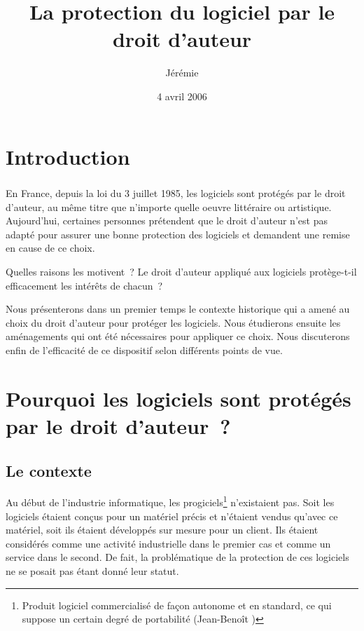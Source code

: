\documentclass[pdftex,a4paper,11pt]{report}
\begin{document}
\title{La protection du logiciel par le droit d'auteur}
\author{
	Jérémie 
}
\date{4 avril 2006}

\maketitle

\chapter*{Introduction}
\paragraph{}
En France, depuis la loi du 3 juillet 1985, les logiciels sont protégés par le droit d'auteur, au même titre que n'importe quelle oeuvre littéraire ou artistique. Aujourd'hui, certaines personnes prétendent que le droit d'auteur n'est pas adapté pour assurer une bonne protection des logiciels et demandent une remise en cause de ce choix.

Quelles raisons les motivent~? Le droit d'auteur appliqué aux logiciels protège-t-il efficacement les intérêts de chacun~?

Nous présenterons dans un premier temps le contexte historique qui a amené au choix du droit d'auteur pour protéger les logiciels. Nous étudierons ensuite les aménagements qui ont été nécessaires pour appliquer ce choix. Nous discuterons enfin de l'efficacité de ce dispositif selon différents points de vue.

\chapter{Pourquoi les logiciels sont protégés par le droit d'auteur~?}

\section{Le contexte}
Au début de l'industrie informatique, les progiciels\footnote{\og Produit logiciel commercialisé de façon autonome et en standard, ce qui suppose un certain degré de portabilité \fg{} (Jean-Benoît )} n'existaient pas. Soit les logiciels étaient conçus pour un matériel précis et n'étaient vendus qu'avec ce matériel, soit ils étaient développés sur mesure pour un client. Ils étaient considérés comme une activité industrielle dans le premier cas et comme un service dans le second. De fait, la problématique de la protection de ces logiciels ne se posait pas étant donné leur statut.
\end{document}
